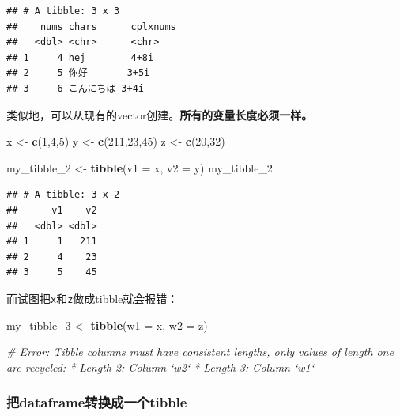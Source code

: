 \documentclass[]{book}
\newenvironment{Shaded}{\begin{snugshade}}{\end{snugshade}}
\newcommand{\CommentTok}[1]{\textcolor[rgb]{0.56,0.35,0.01}{\textit{#1}}}
\newcommand{\DataTypeTok}[1]{\textcolor[rgb]{0.13,0.29,0.53}{#1}}
\newcommand{\DecValTok}[1]{\textcolor[rgb]{0.00,0.00,0.81}{#1}}
\newcommand{\KeywordTok}[1]{\textcolor[rgb]{0.13,0.29,0.53}{\textbf{#1}}}
\newcommand{\NormalTok}[1]{#1}
\newcommand{\StringTok}[1]{\textcolor[rgb]{0.31,0.60,0.02}{#1}}
\begin{document}
\begin{verbatim}
## # A tibble: 3 x 3
##    nums chars      cplxnums
##   <dbl> <chr>      <chr>   
## 1     4 hej        4+8i    
## 2     5 你好       3+5i    
## 3     6 こんにちは 3+4i
\end{verbatim}

类似地，可以从现有的vector创建。\textbf{所有的变量长度必须一样。}

\begin{Shaded}
\begin{Highlighting}[]
\NormalTok{x <-}\StringTok{ }\KeywordTok{c}\NormalTok{(}\DecValTok{1}\NormalTok{,}\DecValTok{4}\NormalTok{,}\DecValTok{5}\NormalTok{)}
\NormalTok{y <-}\StringTok{ }\KeywordTok{c}\NormalTok{(}\DecValTok{211}\NormalTok{,}\DecValTok{23}\NormalTok{,}\DecValTok{45}\NormalTok{)}
\NormalTok{z <-}\StringTok{ }\KeywordTok{c}\NormalTok{(}\DecValTok{20}\NormalTok{,}\DecValTok{32}\NormalTok{)}
\end{Highlighting}
\end{Shaded}

\begin{Shaded}
\begin{Highlighting}[]
\NormalTok{my_tibble_}\DecValTok{2}\NormalTok{ <-}\StringTok{ }\KeywordTok{tibble}\NormalTok{(}\DataTypeTok{v1 =}\NormalTok{ x, }\DataTypeTok{v2 =}\NormalTok{ y)}
\NormalTok{my_tibble_}\DecValTok{2}
\end{Highlighting}
\end{Shaded}

\begin{verbatim}
## # A tibble: 3 x 2
##      v1    v2
##   <dbl> <dbl>
## 1     1   211
## 2     4    23
## 3     5    45
\end{verbatim}

而试图把\texttt{x}和\texttt{z}做成tibble就会报错：

\begin{Shaded}
\begin{Highlighting}[]
\NormalTok{my_tibble_}\DecValTok{3}\NormalTok{ <-}\StringTok{ }\KeywordTok{tibble}\NormalTok{(}\DataTypeTok{w1 =}\NormalTok{ x, }\DataTypeTok{w2 =}\NormalTok{ z)}

 \CommentTok{# Error: Tibble columns must have consistent lengths, only values of length one are recycled: * Length 2: Column `w2` * Length 3: Column `w1`}
\end{Highlighting}
\end{Shaded}

\hypertarget{tibble-create-from-df}{%
\subsubsection{把dataframe转换成一个tibble}\label{tibble-create-from-df}}
\end{document}
